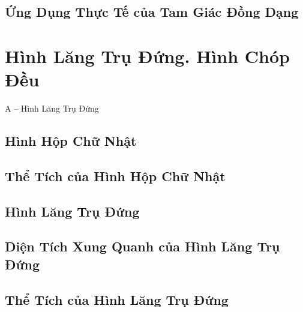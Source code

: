 \documentclass{article}
\numberwithin{equation}{section}
\begin{document}

\subsection{Ứng Dụng Thực Tế của Tam Giác Đồng Dạng}


\section{Hình Lăng Trụ Đứng. Hình Chóp Đều}

\begin{center}
	\Large A -- Hình Lăng Trụ Đứng
\end{center}

\subsection{Hình Hộp Chữ Nhật}


\subsection{Thể Tích của Hình Hộp Chữ Nhật}


\subsection{Hình Lăng Trụ Đứng}


\subsection{Diện Tích Xung Quanh của Hình Lăng Trụ Đứng}


\subsection{Thể Tích của Hình Lăng Trụ Đứng}
\end{document}
